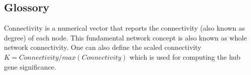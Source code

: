 \subsection{Glossory}
Connectivity is a numerical vector that reports the connectivity (also known as degree) of each node. This fundamental network concept is also known as whole network connectivity. One can also define the scaled connectivity $K = Connectivity/max(Connectivity)$ which is used for computing the hub gene significance.